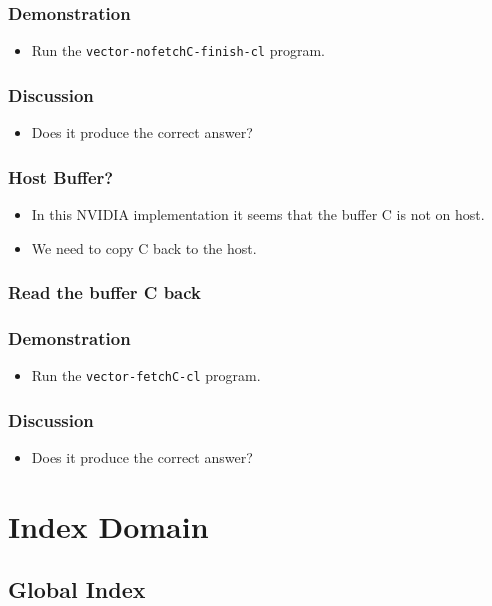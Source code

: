 \documentclass{beamer}
\begin{document}
\begin{frame}
  \frametitle{Demonstration}
  \begin{itemize}
    \item Run the {\tt vector-nofetchC-finish-cl} program.
  \end{itemize}
\end{frame}

\begin{frame}
  \frametitle{Discussion}
  \begin{itemize}
  \item Does it produce the correct answer?
  \end{itemize}
\end{frame}


\begin{frame}
  \frametitle{Host Buffer?}
  \begin{itemize}
    \item In this NVIDIA implementation it seems that the buffer C is not on host.
    \item We need to copy C back to the host.
  \end{itemize}
\end{frame}

\begin{frame}
  \frametitle{Read the buffer C back}
\end{frame}

\begin{frame}
  \frametitle{Demonstration}
  \begin{itemize}
    \item Run the {\tt vector-fetchC-cl} program.
  \end{itemize}
\end{frame}

\begin{frame}
  \frametitle{Discussion}
  \begin{itemize}
  \item Does it produce the correct answer?
  \end{itemize}
\end{frame}

\section{Index Domain}

\subsection{Global Index}
\end{document}
